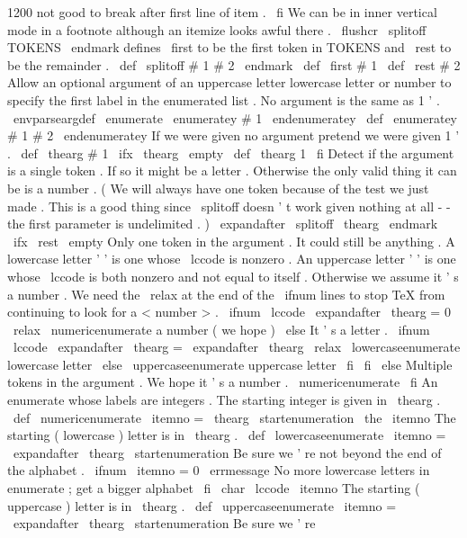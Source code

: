 {{{{{{{1200
}
%
not
good
to
break
after
first
line
of
item
.
\
fi
%
We
can
be
in
inner
vertical
mode
in
a
footnote
although
an
%
itemize
looks
awful
there
.
}
%
\
flushcr
}
%
\
splitoff
TOKENS
\
endmark
defines
\
first
to
be
the
first
token
in
%
TOKENS
and
\
rest
to
be
the
remainder
.
%
\
def
\
splitoff
#
1
#
2
\
endmark
{
\
def
\
first
{
#
1
}
\
def
\
rest
{
#
2
}
}
%
%
Allow
an
optional
argument
of
an
uppercase
letter
lowercase
letter
%
or
number
to
specify
the
first
label
in
the
enumerated
list
.
No
%
argument
is
the
same
as
1
'
.
%
\
envparseargdef
\
enumerate
{
\
enumeratey
#
1
\
endenumeratey
}
\
def
\
enumeratey
#
1
#
2
\
endenumeratey
{
%
%
If
we
were
given
no
argument
pretend
we
were
given
1
'
.
\
def
\
thearg
{
#
1
}
%
\
ifx
\
thearg
\
empty
\
def
\
thearg
{
1
}
\
fi
%
%
Detect
if
the
argument
is
a
single
token
.
If
so
it
might
be
a
%
letter
.
Otherwise
the
only
valid
thing
it
can
be
is
a
number
.
%
(
We
will
always
have
one
token
because
of
the
test
we
just
made
.
%
This
is
a
good
thing
since
\
splitoff
doesn
'
t
work
given
nothing
at
%
all
-
-
the
first
parameter
is
undelimited
.
)
\
expandafter
\
splitoff
\
thearg
\
endmark
\
ifx
\
rest
\
empty
%
Only
one
token
in
the
argument
.
It
could
still
be
anything
.
%
A
lowercase
letter
'
'
is
one
whose
\
lccode
is
nonzero
.
%
An
uppercase
letter
'
'
is
one
whose
\
lccode
is
both
nonzero
and
%
not
equal
to
itself
.
%
Otherwise
we
assume
it
'
s
a
number
.
%
%
We
need
the
\
relax
at
the
end
of
the
\
ifnum
lines
to
stop
TeX
from
%
continuing
to
look
for
a
<
number
>
.
%
\
ifnum
\
lccode
\
expandafter
\
thearg
=
0
\
relax
\
numericenumerate
%
a
number
(
we
hope
)
\
else
%
It
'
s
a
letter
.
\
ifnum
\
lccode
\
expandafter
\
thearg
=
\
expandafter
\
thearg
\
relax
\
lowercaseenumerate
%
lowercase
letter
\
else
\
uppercaseenumerate
%
uppercase
letter
\
fi
\
fi
\
else
%
Multiple
tokens
in
the
argument
.
We
hope
it
'
s
a
number
.
\
numericenumerate
\
fi
}
%
An
enumerate
whose
labels
are
integers
.
The
starting
integer
is
%
given
in
\
thearg
.
%
\
def
\
numericenumerate
{
%
\
itemno
=
\
thearg
\
startenumeration
{
\
the
\
itemno
}
%
}
%
The
starting
(
lowercase
)
letter
is
in
\
thearg
.
\
def
\
lowercaseenumerate
{
%
\
itemno
=
\
expandafter
\
thearg
\
startenumeration
{
%
%
Be
sure
we
'
re
not
beyond
the
end
of
the
alphabet
.
\
ifnum
\
itemno
=
0
\
errmessage
{
No
more
lowercase
letters
in
enumerate
;
get
a
bigger
alphabet
}
%
\
fi
\
char
\
lccode
\
itemno
}
%
}
%
The
starting
(
uppercase
)
letter
is
in
\
thearg
.
\
def
\
uppercaseenumerate
{
%
\
itemno
=
\
expandafter
\
thearg
\
startenumeration
{
%
%
Be
sure
we
'
re
}}}}}}

